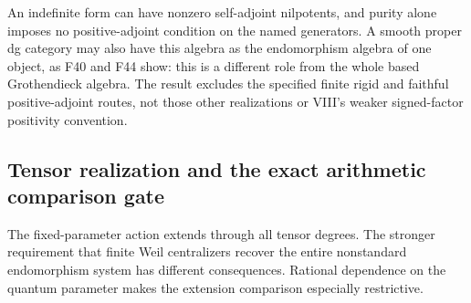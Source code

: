 \documentclass[11pt,a4paper]{article}
\newcommand{\fid}[1]{\textsf{#1}}\newcommand{\gate}[1]{\textsf{#1}}
\theoremstyle{named}\newtheorem{finding}{Finding}[section]
\theoremstyle{definition}\newtheorem{definition}[finding]{Definition}
\theoremstyle{remark}\newtheorem{remark}[finding]{Remark}
\begin{document}
An indefinite form can have nonzero self-adjoint nilpotents,
and purity alone imposes no positive-adjoint condition on the
named generators. A smooth proper dg category may also have
this algebra as the endomorphism algebra of one object, as
\fid{F40} and \fid{F44} show: this is a different role from the
whole based Grothendieck algebra. The result excludes the
specified finite rigid and faithful positive-adjoint routes,
not those other realizations or VIII's weaker signed-factor
positivity convention.


\subsection{Tensor realization and the exact arithmetic comparison gate}
The fixed-parameter action extends through all tensor degrees.
The stronger requirement that finite Weil centralizers recover the
entire nonstandard endomorphism system has different consequences.
Rational dependence on the quantum parameter makes the extension
comparison especially restrictive.
\end{document}
